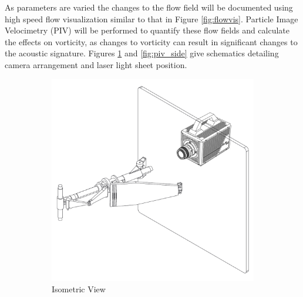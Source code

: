 As parameters are varied the changes to the flow field will be documented using high speed flow visualization similar to that in Figure \ref{fig:flowvis}. Particle Image Velocimetry (PIV) will be performed to quantify these flow fields and calculate the effects on vorticity, as changes to vorticity can result in significant changes to the acoustic signature. Figures \ref{fig:piv_iso} and \ref{fig:piv_side} give schematics detailing camera arrangement and laser light sheet position.

\begin{figure}
\begin{center}
\begin{subfigure}{0.6\textwidth}
\includegraphics[width=\linewidth]{figures/piv_iso}
\caption{Isometric View}
\label{fig:piv_iso}
\end{subfigure}
\begin{subfigure}{0.6\textwidth}

\end{subfigure}
\end{center}
\end{figure}
